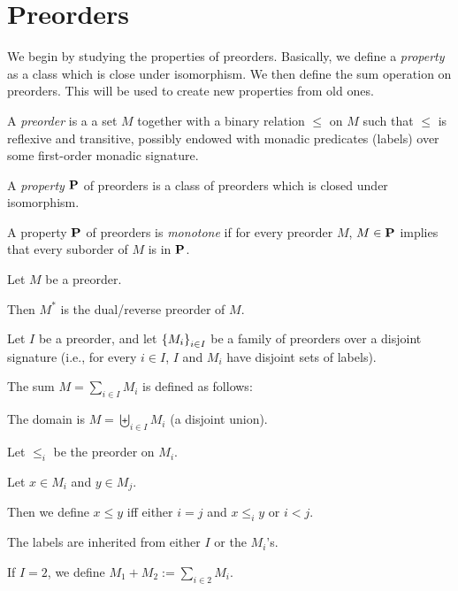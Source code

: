 \section{Preorders}

We begin by studying the properties of preorders.
Basically, we define a \emph{property} as a class which is
close under isomorphism. We then define
the sum operation on preorders. This will be used
to create new properties from old ones.

\begin{definitions} [Preorder]
  A \emph{preorder} is a a set $M$
  together with a binary relation $\le$ on $M$ such that
  $\le$ is reflexive and transitive,
  possibly endowed with monadic predicates (labels)
  over some first-order monadic signature.
\end{definitions}

\begin{definition}
  A \emph{property} $\mathbf{P}$ of preorders is a class of preorders which
  is closed under isomorphism.
\end{definition}

\begin{definition}
  A property $\mathbf{P}$ of preorders is \emph{monotone} if for every preorder $M$,
  $M \in \mathbf{P}$ implies that every suborder of $M$ is in $\mathbf{P}$.
\end{definition}

\begin{definition}
  Let $M$ be a preorder.

  Then $M^\ast$ is the dual/reverse preorder of $M$.
\end{definition}

\begin{definition}
  Let $I$ be a preorder, and let $\left\{ {M_i} \right\}_{i \in I}$ be a family of preorders over
  a disjoint signature (i.e., for every $i \in I$, $I$ and $M_i$ have disjoint sets of labels).

  The sum $M = \sum_{i \in I} M_i$ is defined as follows:

  The domain is $M = \biguplus_{i \in I} M_i$ (a disjoint union).

  Let $\le_i$ be the preorder on $M_i$.

  Let $x \in M_i$ and $y \in M_j$.

  Then we define $x \le y$ iff either
  $i = j$ and $x \le_i y$ or $i < j$.

  The labels are inherited from either $I$ or the $M_i$'s.

  If $I = 2$, we define $M_1 + M_2 := \sum_{i \in 2} M_i$.
\end{definition}

